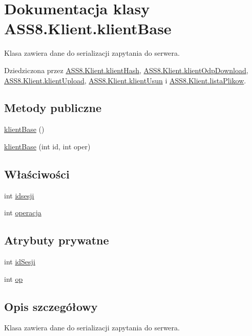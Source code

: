 \hypertarget{a00007}{
\section{Dokumentacja klasy ASS8.Klient.klientBase}
\label{de/d5e/a00007}
}
Klasa zawiera dane do serializacji zapytania do serwera.  


Dziedziczona przez \hyperlink{a00008}{ASS8.Klient.klientHash}, \hyperlink{a00010}{ASS8.Klient.klientOdpDownload}, \hyperlink{a00011}{ASS8.Klient.klientUpload}, \hyperlink{a00012}{ASS8.Klient.klientUsun} i \hyperlink{a00015}{ASS8.Klient.listaPlikow}.

\subsection*{Metody publiczne}
\begin{CompactItemize}
\item 
\hyperlink{a00007_04276cdf60f7e66500f18bcfb19b67cc}{klientBase} ()
\item 
\hyperlink{a00007_32b59b552ea509fedbaa45a54d8b6d4b}{klientBase} (int id, int oper)
\end{CompactItemize}
\subsection*{Właściwości}
\begin{CompactItemize}
\item 
int \hyperlink{a00007_10f9e496d18b642305c5b7abf472f355}{idsesji}
\item 
int \hyperlink{a00007_fe6646ec940736ab25958681a9044b7f}{operacja}
\end{CompactItemize}
\subsection*{Atrybuty prywatne}
\begin{CompactItemize}
\item 
int \hyperlink{a00007_f34be337f7af90ae43a8a7df4f481a52}{idSesji}
\item 
int \hyperlink{a00007_b11ab72b0ec00711ba94090856560218}{op}
\end{CompactItemize}


\subsection{Opis szczegółowy}
Klasa zawiera dane do serializacji zapytania do serwera. 



